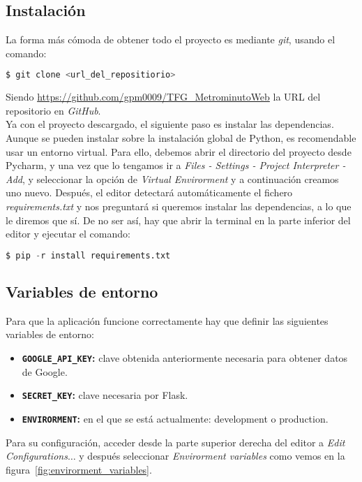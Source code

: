 \subsection{Instalación}
La forma más cómoda de obtener todo el proyecto es mediante \textit{git}, usando el comando:
\renewcommand{\lstlistingname}{Instalación}%
\renewcommand{\lstlistlistingname}{List of \lstlistingname s}
\begin{lstlisting}[language=python,caption={Descargar el repositorio.}]
 $ git clone <url_del_repositiorio>
\end{lstlisting}
Siendo \url{https://github.com/gpm0009/TFG_MetrominutoWeb} la URL del repositorio en \textit{GitHub}.
\\
Ya con el proyecto descargado, el siguiente paso es instalar las dependencias. Aunque se pueden instalar sobre la instalación global de Python, es recomendable usar un entorno virtual. Para ello, debemos abrir el directorio del proyecto desde Pycharm, y una vez que lo tengamos ir a \textit{Files - Settings - Project Interpreter - Add}, y seleccionar la opción de \textit{Virtual Envirorment} y a continuación creamos uno nuevo.
Después, el editor detectará automáticamente el fichero \textit{requirements.txt} y nos preguntará si queremos instalar las dependencias, a lo que le diremos que sí. De no ser así, hay que abrir la terminal en la parte inferior del editor y ejecutar el comando:
\begin{lstlisting}[language=python,caption={Instalar dependencias en el entorno virtual.}]
$ pip -r install requirements.txt
\end{lstlisting}

\subsection{Variables de entorno}\label{variables_entorno}
Para que la aplicación funcione correctamente hay que definir las siguientes variables de entorno:
\begin{itemize}
	\item \textbf{\texttt{GOOGLE\_API\_KEY}:} clave obtenida anteriormente necesaria para obtener datos de Google.
	\item \textbf{\texttt{SECRET\_KEY}:} clave necesaria por Flask.
	\item \textbf{\texttt{ENVIRORMENT}:} en el que se está actualmente: development o production.
\end{itemize}
Para su configuración, acceder desde la parte superior derecha del editor a \textit{Edit Configurations$\dots$} y después seleccionar \textit{Envirorment variables} como vemos en la figura~\ref{fig:envirorment_variables}.

